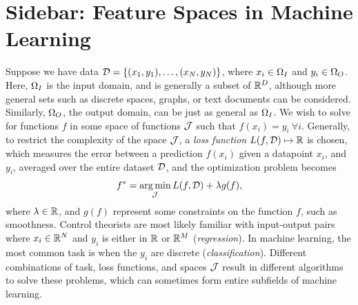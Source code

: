 \section[Feature Spaces in Machine Learning]{Sidebar: Feature Spaces in Machine Learning}\label{sb:featspace}
Suppose we have data $\mathcal{D} = \{(x_1,y_1), \dots, (x_{N},y_{N})\}$, where $x_i\in\Omega_I$ and $y_i\in\Omega_O$. Here, $\Omega_I$ is the input domain, and 
is generally a subset of $\mathbb{R}^D$, although more general sets such as discrete spaces, graphs, or text documents can be considered.
Similarly, $\Omega_O$, the output domain, can be just as general as $\Omega_I$. We wish to solve for functions $f$ in some space 
of functions $\mathcal{J}$ such that $f(x_i) = y_i \ \forall i$. Generally, to restrict the complexity of the space $\mathcal{J}$,
a \emph{loss function} $L(f, \mathcal{D})\mapsto\mathbb{R}$ is chosen, which measures the error between a prediction $f(x_i)$ given a datapoint 
$x_i$, and $y_i$, averaged over the entire dataset $\mathcal{D}$, and the optimization problem becomes 
\begin{align}
 f^* = \operatorname*{arg\,min}_{\mathcal{J}}L(f, \mathcal{D}) + \lambda g(f),
\end{align}
where $\lambda\in\mathbb{R}$, and $g(f)$ represent some constraints on the function $f$, such as smoothness. 
Control theorists are most likely familiar with 
input-output pairs where $x_i\in\mathbb{R}^N$ and $y_i$ is either in $\mathbb{R}$ or $\mathbb{R}^M$ (\emph{regression}). 
In machine learning, the most common task is when the $y_i$ are discrete (\emph{classification}). 
Different combinations of task, loss functions, and spaces $\mathcal{J}$ result in different algorithms to solve these problems,
which can sometimes form entire subfields of machine learning. 

